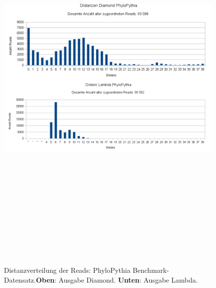 \documentclass[10pt, a4paper]{report}[08.12.2015]
\begin{document}
     \begin{figure}[H]
      \centering
      \noindent\includegraphics[width=\linewidth,height=20cm,
      keepaspectratio]{Abbildungen/PhyloPythia_Distanzen_both.png}
      \caption[Distanzverteilung der Reads: PhyloPythia Benchmark-Datensatz.]{\small{Distanzverteilung der Reads: PhyloPythia Benchmark-Datensatz.\newline \textbf{Oben}: Ausgabe Diamond. \textbf{Unten}: Ausgabe Lambda.}}
      \label{fig:phylopythia}
    \end{figure}
\end{document}
